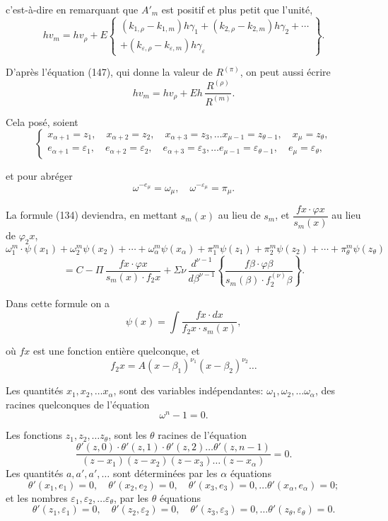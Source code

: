 \documentclass{article}
\begin{document}
c'est-à-dire en remarquant que $A'_m$ est positif et plus petit que l'unité,
\[ hv_m = hv_\rho + E \begin{Bmatrix} (k_{1,\rho}-k_{1,m})h\gamma_1+(k_{2,\rho}-k_{2,m})h\gamma_2+\cdots \\ +(k_{\varepsilon,\rho}-k_{\varepsilon,m})h\gamma_\varepsilon \end{Bmatrix}. \tag{175} \]

D'après l'équation (147), qui donne la valeur de $R^{(\pi)}$, on peut aussi écrire
\[ hv_m = hv_\rho + Eh\,\frac{R^{(\rho)}}{R^{(m)}}. \tag{176} \]

Cela posé, soient
\[ \begin{cases} x_{\alpha+1} = z_1, \quad x_{\alpha+2} = z_2, \quad x_{\alpha+3} = z_3, \ldots x_{\mu-1} = z_{\theta-1}, \quad x_\mu = z_\theta, \\ e_{\alpha+1} = \varepsilon_1, \quad e_{\alpha+2} = \varepsilon_2, \quad e_{\alpha+3} = \varepsilon_3, \ldots e_{\mu-1} = \varepsilon_{\theta-1}, \quad e_\mu = \varepsilon_\theta, \end{cases} \tag{177} \]

et pour abréger
\[ \omega^{-e_\mu} = \omega_\mu, \quad \omega^{-\varepsilon_\mu} = \pi_\mu. \tag{178} \]

La formule (134) deviendra, en mettant $s_m(x)$ au lieu de $s_m$, et $\dfrac{f x \cdot \varphi x}{s_m(x)}$ au lieu de $\varphi_2 x$,
\[ \omega_1^{m} \cdot \psi(x_1)+\omega_2^{m}\psi(x_2)+\cdots+\omega_\alpha^{m}\psi(x_\alpha)+\pi_1^{m}\psi(z_1)+\pi_2^{m}\psi(z_2)+\cdots+\pi_\theta^{m}\psi(z_\theta) \]
\[ = C - \Pi\,\frac{f x \cdot \varphi x}{s_m(x) \cdot f_2 x} + \Sigma\nu\,\frac{d^{\nu-1}}{d\beta^{\nu-1}} \left\{ \frac{f\beta \cdot \varphi\beta}{s_m(\beta) \cdot f_2^{(\nu)}\beta} \right\}. \tag{179} \]

Dans cette formule on a
\[ \psi(x) = \int \frac{f x \cdot dx}{f_2 x \cdot s_m(x)}, \tag{180} \]

où $f x$ est une fonction entière quelconque, et
\[ f_2 x = A(x-\beta_1)^{\nu_1}(x-\beta_2)^{\nu_2} \ldots \]

Les quantités $x_1, x_2, \ldots x_\alpha$, sont des variables indépendantes: $\omega_1, \omega_2, \ldots \omega_\alpha$, des racines quelconques de l'équation
\[ \omega^{n} - 1 = 0. \]

Les fonctions $z_1, z_2, \ldots z_\theta$, sont les $\theta$ racines de l'équation
\[ \frac{\theta'(z,0) \cdot \theta'(z,1) \cdot \theta'(z,2) \ldots \theta'(z,n-1)}{(z-x_1)(z-x_2)(z-x_3) \ldots (z-x_\alpha)} = 0. \tag{181} \]
Les quantités $a, a', a', \ldots$ sont déterminées par les $\alpha$ équations
\[ \theta'(x_1,e_1) = 0, \quad \theta'(x_2,e_2) = 0, \quad \theta'(x_3,e_3) = 0, \ldots \theta'(x_\alpha,e_\alpha) = 0; \tag{182} \]
et les nombres $\varepsilon_1, \varepsilon_2, \ldots \varepsilon_\theta$, par les $\theta$ équations
\[ \theta'(z_1,\varepsilon_1) = 0, \quad \theta'(z_2,\varepsilon_2) = 0, \quad \theta'(z_3,\varepsilon_3) = 0, \ldots \theta'(z_\theta,\varepsilon_\theta) = 0. \tag{183} \]
\end{document}
